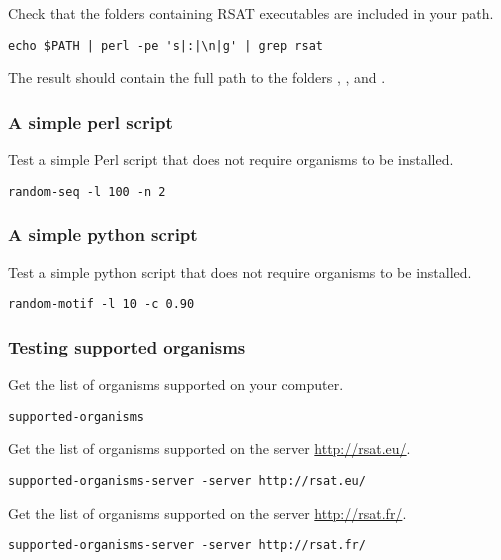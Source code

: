 \documentclass[12pt,a4paper, oneside]{scrreprt} %
\begin{document}
Check that the folders containing RSAT executables are included in
your path.

\begin{lstlisting}
echo $PATH | perl -pe 's|:|\n|g' | grep rsat
\end{lstlisting}

The result should contain the full path to the folders ,
, and .

\subsubsection{A simple \RSAT perl script}

Test a simple Perl script that does not require organisms to be
installed.

\begin{lstlisting}
random-seq -l 100 -n 2
\end{lstlisting}

\subsubsection{A simple \RSAT python script}

Test a simple python script that does not require organisms to be
installed.

\begin{lstlisting}
random-motif -l 10 -c 0.90
\end{lstlisting}

\subsubsection{Testing supported organisms}

Get the list of organisms supported on your computer.

\begin{lstlisting}
supported-organisms
\end{lstlisting}

Get the list of organisms supported on the server \url{http://rsat.eu/}. 

\begin{lstlisting}
supported-organisms-server -server http://rsat.eu/
\end{lstlisting}

Get the list of organisms supported on the server
\url{http://rsat.fr/}.

\begin{lstlisting}
supported-organisms-server -server http://rsat.fr/
\end{lstlisting}
\end{document}
